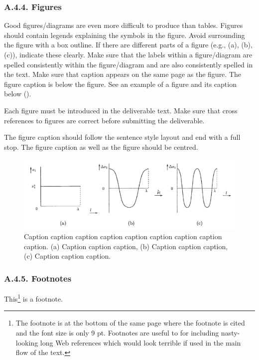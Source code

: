 \subsubsection*{A.4.4. Figures}
\label{sec:appendix-a44-figures}

Good figures/diagrams are even more difficult to produce than tables. Figures should contain legends explaining the symbols in the figure. Avoid surrounding the figure with a box outline. If there are different parts of a figure (e.g., (a), (b), (c)), indicate these clearly. Make sure that the labels within a figure/diagram are spelled consistently within the figure/diagram and are also consistently spelled in the text. Make sure that caption appears on the same page as the figure. The figure caption is below the figure. See an example of a figure and its caption below ().

Each figure must be introduced in the deliverable text. Make sure that cross references to figures are correct before submitting the deliverable.

The figure caption should follow the sentence style layout and end with a full stop. The figure caption as well as the figure should be centred.

\begin{figure}[htb]
	\centering
	\includegraphics[width=.89\linewidth]{graphics/figure}
	\caption{Caption caption caption caption caption caption caption caption caption. (a) Caption caption caption, (b) Caption caption caption, (c) Caption caption caption.}
	\label{fig:figure}
\end{figure}

\subsubsection*{A.4.5. Footnotes}
\label{sec:appendix-a45-footnotes}

This\footnote{The footnote is at the bottom of the same page where the footnote is cited and the font size is only 9 pt. Footnotes are useful to for including nasty-looking long Web references which would look terrible if used in the main flow of the text.} is a footnote.

